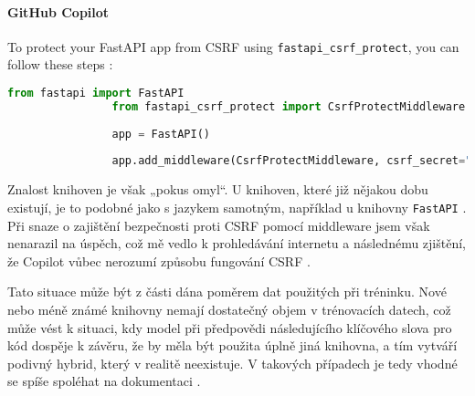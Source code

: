 \documentclass[FM,DP]{tulthesis}
\begin{document}
		\vspace{0.6em}
		\begin{tcolorbox}[colback=white,colframe=black,title=Implementace CSRF v Pythonu]
			\paragraph{GitHub Copilot}
			To protect your FastAPI app from CSRF using \verb|fastapi_csrf_protect|, you can follow these steps \cite{middleware}:
			
			\begin{lstlisting}[language=Python]
				from fastapi import FastAPI
				from fastapi_csrf_protect import CsrfProtectMiddleware
				
				app = FastAPI()
				
				app.add_middleware(CsrfProtectMiddleware, csrf_secret="your_secret_key")
			\end{lstlisting}
		\end{tcolorbox}
		
		Znalost knihoven je však „pokus omyl“. U knihoven, které již nějakou dobu existují, je to podobné jako s jazykem samotným, například u knihovny \verb|FastAPI| \cite{fastapi}. Při snaze o zajištění bezpečnosti proti CSRF pomocí middleware jsem však nenarazil na úspěch, což mě vedlo k prohledávání internetu a následnému zjištění, že Copilot vůbec nerozumí způsobu fungování CSRF \cite{csrf} \cite{csrf_web}.
		
		Tato situace může být z části dána poměrem dat použitých při tréninku. Nové nebo méně známé knihovny nemají dostatečný objem v trénovacích datech, což může vést k situaci, kdy model při předpovědi následujícího klíčového slova pro kód dospěje k závěru, že by měla být použita úplně jiná knihovna, a tím vytváří podivný hybrid, který v realitě neexistuje. V takových případech je tedy vhodné se spíše spoléhat na dokumentaci \cite{chinchilla}.
		
\end{document}
